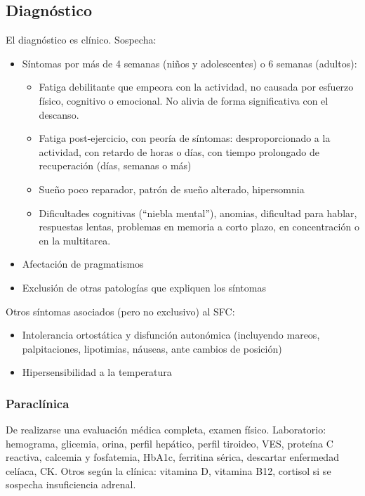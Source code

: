 \subsection*{Diagnóstico}
El diagnóstico es clínico.
Sospecha:
\begin{itemize}
	\item Síntomas por más de 4 semanas (niños y adolescentes) o 6 semanas (adultos):
	\begin{itemize}
		\item Fatiga debilitante que empeora con la actividad, no causada por esfuerzo físico, cognitivo o emocional. No alivia de forma significativa con el descanso.
		\item Fatiga post-ejercicio, con peoría de síntomas: desproporcionado a la actividad, con retardo de horas o días, con tiempo prolongado de recuperación (días, semanas o más)
		\item Sueño poco reparador, patrón de sueño alterado, hipersomnia
		\item Dificultades cognitivas (``niebla mental''), anomias, dificultad para hablar, respuestas lentas, problemas en memoria a corto plazo, en concentración o en la multitarea.
	\end{itemize}
	\item Afectación de pragmatismos
	\item Exclusión de otras patologías que expliquen los síntomas
\end{itemize}
Otros síntomas asociados (pero no exclusivo) al SFC:
\begin{itemize}
	\item Intolerancia ortostática y disfunción autonómica (incluyendo mareos, palpitaciones, lipotimias, náuseas, ante cambios de posición)
	\item Hipersensibilidad a la temperatura
\end{itemize}
\subsubsection*{Paraclínica}
De realizarse una evaluación médica completa, examen físico.
Laboratorio: hemograma, glicemia, orina, perfil hepático, perfil tiroideo, VES, proteína C reactiva, calcemia y fosfatemia, HbA1c, ferritina sérica, descartar enfermedad celíaca, CK.
Otros según la clínica: vitamina D, vitamina B12, cortisol si se sospecha insuficiencia adrenal.

\printbibliography
